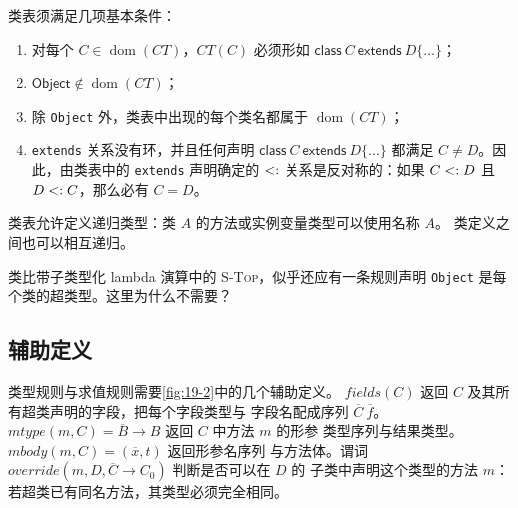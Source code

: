 类表须满足几项基本条件：
\begin{enumerate}
\item 对每个 \(C\in\operatorname{dom}(CT)\)，\(CT(C)\) 必须形如
  \(\mathsf{class}\ C\ \mathsf{extends}\ D\{\ldots\}\)；
\item \(\mathsf{Object}\notin\operatorname{dom}(CT)\)；
\item 除 \texttt{Object} 外，类表中出现的每个类名都属于
  \(\operatorname{dom}(CT)\)；
\item \texttt{extends} 关系没有环，并且任何声明
  \(\mathsf{class}\ C\ \mathsf{extends}\ D\{\ldots\}\) 都满足
  \(C\ne D\)。因此，由类表中的 \texttt{extends} 声明确定的
  \(\mathrel{<:}\) 关系是反对称的：如果 \(C\mathrel{<:} D\) 且
  \(D\mathrel{<:} C\)，那么必有 \(C=D\)。
\end{enumerate}


类表允许定义递归类型：类 \(A\) 的方法或实例变量类型可以使用名称 \(A\)。
类定义之间也可以相互递归。

\begin{exercise}[\(\star\)]
\label{ex:19.4.1}
类比带子类型化 lambda 演算中的 \textsc{S-Top}，似乎还应有一条规则声明
\texttt{Object} 是每个类的超类型。这里为什么不需要？
\end{exercise}

\subsection*{辅助定义}

类型规则与求值规则需要\cref{fig:19-2}中的几个辅助定义。
\(\mathit{fields}(C)\) 返回 \(C\) 及其所有超类声明的字段，把每个字段类型与
字段名配成序列 \(\overline C\ \overline f\)。
\(\mathit{mtype}(m,C)=\overline B\to B\) 返回 \(C\) 中方法 \(m\) 的形参
类型序列与结果类型。\(\mathit{mbody}(m,C)=(\overline x,t)\) 返回形参名序列
与方法体。谓词
\(\mathit{override}(m,D,\overline C\to C_0)\) 判断是否可以在 \(D\) 的
子类中声明这个类型的方法 \(m\)：若超类已有同名方法，其类型必须完全相同。

